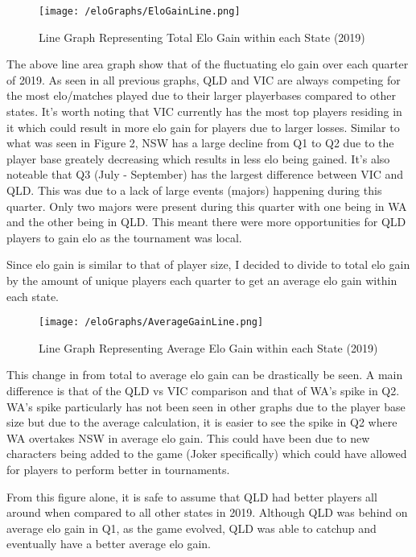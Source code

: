 \documentclass[11pt, oneside, a4paper]{article}
\begin{document}
\begin{figure}[!ht]
	\centerline{\texttt{[image: /eloGraphs/EloGainLine.png]}}
	\caption{Line Graph Representing Total Elo Gain within each State (2019)}
	\label{fig:figure2}
\end{figure}

The above line area graph show that of the fluctuating elo gain over each quarter of 2019. As seen in all previous graphs, QLD and VIC are always competing for the most elo/matches played due to their larger playerbases compared to other states. It's worth noting that VIC currently has the most top players residing in it which could result in more elo gain for players due to larger losses. Similar to what was seen in Figure 2, NSW has a large decline from Q1 to Q2 due to the player base greately decreasing which results in less elo being gained. It's also noteable that Q3 (July - September) has the largest difference between VIC and QLD. This was due to a lack of large events (majors) happening during this quarter. Only two majors were present during this quarter with one being in WA and the other being in QLD. This meant there were more opportunities for QLD players to gain elo as the tournament was local.

\newpage
Since elo gain is similar to that of player size, I decided to divide to total elo gain by the amount of unique players each quarter to get an average elo gain within each state.

\begin{figure}[!ht]
	\centerline{\texttt{[image: /eloGraphs/AverageGainLine.png]}}
	\caption{Line Graph Representing Average Elo Gain within each State (2019)}
	\label{fig:figure2}
\end{figure}

This change in from total to average elo gain can be drastically be seen. A main difference is that of the QLD vs VIC comparison and that of WA's spike in Q2. WA's spike particularly has not been seen in other graphs due to the player base size but due to the average calculation, it is easier to see the spike in Q2 where WA overtakes NSW in average elo gain. This could have been due to new characters being added to the game (Joker specifically) which could have allowed for players to perform better in tournaments.

From this figure alone, it is safe to assume that QLD had better players all around when compared to all other states in 2019. Although QLD was behind on average elo gain in Q1, as the game evolved, QLD was able to catchup and eventually have a better average elo gain.
\end{document}
